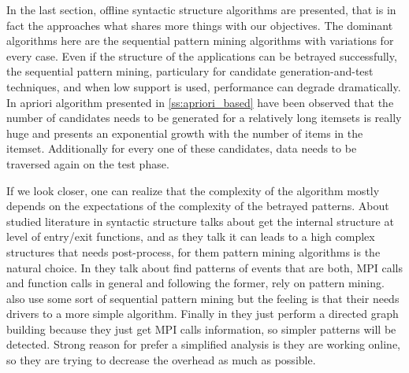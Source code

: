 In the last section, offline syntactic structure algorithms are presented, that
is in fact the approaches what shares more things with our objectives. The
dominant algorithms here are the sequential pattern mining algorithms with
variations for every case. Even if the structure of the applications can be
betrayed successfully, the sequential pattern mining, particulary for candidate 
generation-and-test techniques, and when low support is used, performance can 
degrade dramatically. In apriori algorithm presented in \ref{ss:apriori_based} 
have been observed that
the number of candidates needs to be generated for a relatively long itemsets is
really huge and presents an exponential growth with the number of items in the
itemset. Additionally for every one of these candidates, data needs to be
traversed again on the test phase.

If we look closer, one can realize that the complexity of the algorithm mostly 
depends on the expectations of the complexity of the betrayed patterns. 
About studied literature in syntactic 
structure \cite{Safyallah2006} \cite{Zhao2008} talks about get the 
internal structure at level of entry/exit functions, and as they talk it can 
leads to a high complex structures that needs post-process, for them 
pattern mining algorithms is the natural choice. In \cite{trahay2015selecting}
they talk about find patterns of events that are both, MPI calls and function
calls in general and following the former, rely on pattern mining. 
\cite{noeth2009scalatrace} also use some sort of sequential pattern mining but 
the feeling is that their needs drivers to a more simple algorithm. Finally in
\cite{aguilar2016event} they just perform a directed graph building because they
just get MPI calls information, so simpler patterns will be detected. Strong
reason for prefer a simplified analysis is they are working online, so they are
trying to decrease the overhead as much as possible.
